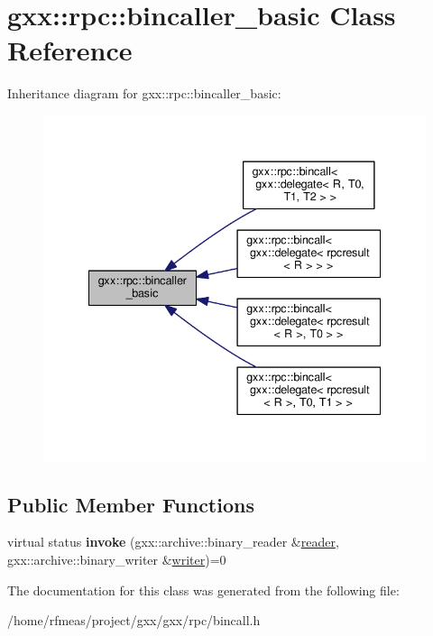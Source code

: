 \hypertarget{classgxx_1_1rpc_1_1bincaller__basic}{}\section{gxx\+:\+:rpc\+:\+:bincaller\+\_\+basic Class Reference}
\label{classgxx_1_1rpc_1_1bincaller__basic}


Inheritance diagram for gxx\+:\+:rpc\+:\+:bincaller\+\_\+basic\+:
\nopagebreak
\begin{figure}[H]
\begin{center}
\leavevmode
\includegraphics[width=335pt]{classgxx_1_1rpc_1_1bincaller__basic__inherit__graph}
\end{center}
\end{figure}
\subsection*{Public Member Functions}
\begin{DoxyCompactItemize}
\item 
virtual status {\bfseries invoke} (gxx\+::archive\+::binary\+\_\+reader \&\hyperlink{classgxx_1_1reader}{reader}, gxx\+::archive\+::binary\+\_\+writer \&\hyperlink{classgxx_1_1writer}{writer})=0\hypertarget{classgxx_1_1rpc_1_1bincaller__basic_a62fb243bb96c754bb9b15b3d87c1b499}{}\label{classgxx_1_1rpc_1_1bincaller__basic_a62fb243bb96c754bb9b15b3d87c1b499}

\end{DoxyCompactItemize}


The documentation for this class was generated from the following file\+:\begin{DoxyCompactItemize}
\item 
/home/rfmeas/project/gxx/gxx/rpc/bincall.\+h\end{DoxyCompactItemize}
